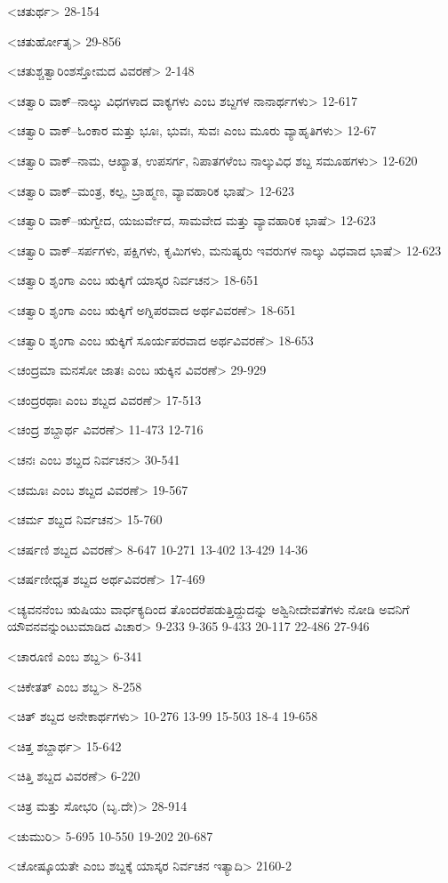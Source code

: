 <ಚತುರ್ಥ>
28-154

<ಚತುರ್ಹೋತೃ>
29-856

<ಚತುಶ್ಚತ್ವಾರಿಂಶಸ್ತೋಮದ ವಿವರಣೆ>
2-148

<ಚತ್ವಾರಿ ವಾಕ್‍–ನಾಲ್ಕು ವಿಧಗಳಾದ ವಾಕ್ಯಗಳು ಎಂಬ ಶಬ್ದಗಳ ನಾನಾರ್ಥಗಳು>
12-617

<ಚತ್ವಾರಿ ವಾಕ್‍–ಓಂಕಾರ ಮತ್ತು ಭೂಃ, ಭುವಃ, ಸುವಃ ಎಂಬ ಮೂರು ವ್ಯಾಹೃತಿಗಳು>
12-67

<ಚತ್ವಾರಿ ವಾಕ್‍–ನಾಮ, ಆಖ್ಯಾತ, ಉಪಸರ್ಗ, ನಿಪಾತಗಳೆಂಬ ನಾಲ್ಕುವಿಧ ಶಬ್ದ ಸಮೂಹಗಳು>
12-620

<ಚತ್ವಾರಿ ವಾಕ್‍–ಮಂತ್ರ, ಕಲ್ಪ, ಬ್ರಾಹ್ಮಣ, ವ್ಯಾವಹಾರಿಕ ಭಾಷೆ>
12-623

<ಚತ್ವಾರಿ ವಾಕ್‍–ಋಗ್ವೇದ, ಯಜುರ್ವೇದ, ಸಾಮವೇದ ಮತ್ತು ವ್ಯಾವಹಾರಿಕ ಭಾಷೆ>
12-623

<ಚತ್ವಾರಿ ವಾಕ್‍–ಸರ್ಪಗಳು, ಪಕ್ಷಿಗಳು, ಕೃಮಿಗಳು, ಮನುಷ್ಯರು ಇವರುಗಳ ನಾಲ್ಕು ವಿಧವಾದ ಭಾಷೆ>
12-623

<ಚತ್ವಾರಿ ಶೃಂಗಾ ಎಂಬ ಋಕ್ಕಿಗೆ ಯಾಸ್ಕರ ನಿರ್ವಚನ>
18-651

<ಚತ್ವಾರಿ ಶೃಂಗಾ ಎಂಬ ಋಕ್ಕಿಗೆ ಅಗ್ನಿಪರವಾದ ಅರ್ಥವಿವರಣೆ>
18-651

<ಚತ್ವಾರಿ ಶೃಂಗಾ ಎಂಬ ಋಕ್ಕಿಗೆ ಸೂರ್ಯಪರವಾದ ಅರ್ಥವಿವರಣೆ>
18-653

<ಚಂದ್ರಮಾ ಮನಸೋ ಜಾತಃ ಎಂಬ ಋಕ್ಕಿನ ವಿವರಣೆ>
29-929

<ಚಂದ್ರರಥಾಃ ಎಂಬ ಶಬ್ದದ ವಿವರಣೆ>
17-513

<ಚಂದ್ರ ಶಬ್ದಾರ್ಥ ವಿವರಣೆ>
11-473
12-716

<ಚನಃ ಎಂಬ ಶಬ್ದದ ನಿರ್ವಚನ>
30-541

<ಚಮೂಃ ಎಂಬ ಶಬ್ದದ ವಿವರಣೆ>
19-567

<ಚರ್ಮ ಶಬ್ದದ ನಿರ್ವಚನ>
15-760

<ಚರ್ಷಣಿ ಶಬ್ದದ ವಿವರಣೆ>
8-647 
10-271 
13-402 
13-429
14-36

<ಚರ್ಷಣೀಧೃತ ಶಬ್ದದ ಅರ್ಥವಿವರಣೆ>
17-469

<ಚ್ಯವನನೆಂಬ ಋಷಿಯು ವಾರ್ಧಕ್ಯದಿಂದ ತೊಂದರೆಪಡುತ್ತಿದ್ದುದನ್ನು ಅಶ್ವಿನೀದೇವತೆಗಳು ನೋಡಿ ಅವನಿಗೆ ಯೌವನವನ್ನುಂಟುಮಾಡಿದ ವಿಚಾರ>
9-233 
9-365 
9-433 
20-117 
22-486 
27-946

<ಚಾರೂಣಿ ಎಂಬ ಶಬ್ದ>
6-341

<ಚಿಕೇತತ್‍ ಎಂಬ ಶಬ್ದ>
8-258

<ಚಿತ್‍ ಶಬ್ದದ ಅನೇಕಾರ್ಥಗಳು>
10-276 
13-99 
15-503 
18-4 
19-658

<ಚಿತ್ತ ಶಬ್ದಾರ್ಥ>
15-642

<ಚಿತ್ತಿ ಶಬ್ದದ ವಿವರಣೆ>
6-220

<ಚಿತ್ರ ಮತ್ತು ಸೋಭರಿ (ಬೃ.ದೇ)>
28-914

<ಚುಮುರಿ>
5-695 
10-550 
19-202 
20-687

<ಚೋಷ್ಕೂಯತೇ ಎಂಬ ಶಬ್ದಕ್ಕೆ ಯಾಸ್ಕರ ನಿರ್ವಚನ ಇತ್ಯಾದಿ>
2160-2

